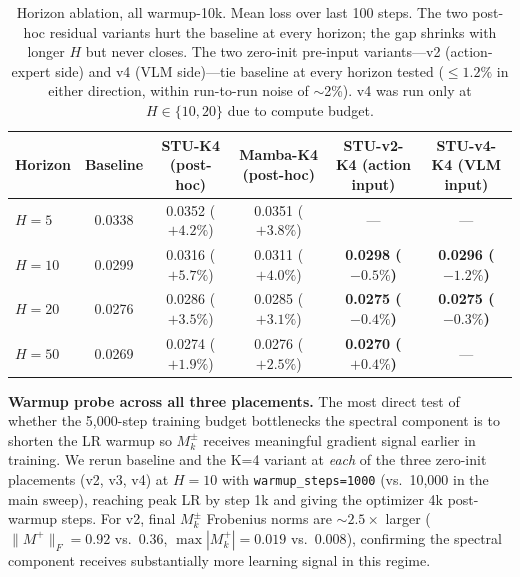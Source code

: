 \documentclass[10pt, letterpaper]{article}
\begin{document}
\begin{table}[h]
\centering
\small
\begin{tabular}{@{}lccccc@{}}
\toprule
\textbf{Horizon} & \textbf{Baseline} & \textbf{STU-K4 (post-hoc)} & \textbf{Mamba-K4 (post-hoc)} & \textbf{STU-v2-K4 (action input)} & \textbf{STU-v4-K4 (VLM input)} \\
\midrule
$H{=}5$  & 0.0338 & 0.0352 ($+4.2\%$) & 0.0351 ($+3.8\%$) & --- & --- \\
$H{=}10$ & 0.0299 & 0.0316 ($+5.7\%$) & 0.0311 ($+4.0\%$) & \textbf{0.0298 ($-0.5\%$)} & \textbf{0.0296 ($-1.2\%$)} \\
$H{=}20$ & 0.0276 & 0.0286 ($+3.5\%$) & 0.0285 ($+3.1\%$) & \textbf{0.0275 ($-0.4\%$)} & \textbf{0.0275 ($-0.3\%$)} \\
$H{=}50$ & 0.0269 & 0.0274 ($+1.9\%$) & 0.0276 ($+2.5\%$) & \textbf{0.0270 ($+0.4\%$)} & --- \\
\bottomrule
\end{tabular}
\caption{Horizon ablation, all warmup-10k. Mean loss over last 100 steps. The two post-hoc residual variants hurt the baseline at every horizon; the gap shrinks with longer $H$ but never closes. The two zero-init pre-input variants---v2 (action-expert side) and v4 (VLM side)---tie baseline at every horizon tested ($\le 1.2\%$ in either direction, within run-to-run noise of $\sim$2\%). v4 was run only at $H \in \{10, 20\}$ due to compute budget.}
\label{tab:horizon}
\end{table}

\textbf{Warmup probe across all three placements.}
The most direct test of whether the 5{,}000-step training budget bottlenecks the spectral component is to shorten the LR warmup so $M_k^\pm$ receives meaningful gradient signal earlier in training. We rerun baseline and the K=4 variant at \emph{each} of the three zero-init placements (v2, v3, v4) at $H{=}10$ with \texttt{warmup\_steps=1000} (vs.\ 10{,}000 in the main sweep), reaching peak LR by step 1k and giving the optimizer 4k post-warmup steps. For v2, final $M_k^\pm$ Frobenius norms are $\sim 2.5\times$ larger ($\|M^+\|_F = 0.92$ vs.\ $0.36$, $\max |M^+_k| = 0.019$ vs.\ $0.008$), confirming the spectral component receives substantially more learning signal in this regime.
\end{document}

